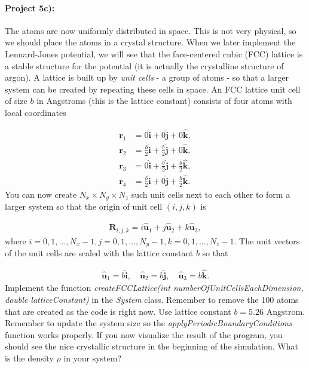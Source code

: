 \documentclass[%
oneside,                 %
final,                   %
10pt]{article}
\begin{document}
\paragraph{Project 5c):}
The atoms are now uniformly distributed in space. This is not very physical, so we should place the atoms in a crystal structure. When we later implement the Lennard-Jones potential, we will see that the face-centered cubic (FCC) lattice is a stable structure for the potential (it is actually the crystalline structure of argon). A lattice is built up by \emph{unit cells} - a group of atoms - so that a larger system can be created by repeating these cells in space. An FCC lattice unit cell of size $b$ in Angstroms (this is the lattice constant) consists of four atoms with local coordinates

\begin{align}
	\mathbf{r}_1 &= 0 \hat{\mathbf{i}} + 0 \hat{\mathbf{j}} + 0 \hat{\mathbf{k}},\\
	\mathbf{r}_2 &= \frac{b}{2} \hat{\mathbf{i}} + \frac{b}{2} \hat{\mathbf{j}} + 0 \hat{\mathbf{k}},\\
	\mathbf{r}_3 &= 0 \hat{\mathbf{i}} + \frac{b}{2} \hat{\mathbf{j}} + \frac{b}{2} \hat{\mathbf{k}},\\
	\mathbf{r}_4 &= \frac{b}{2} \hat{\mathbf{i}} + 0 \hat{\mathbf{j}} + \frac{b}{2} \hat{\mathbf{k}}.
\end{align}
You can now create $N_x \times N_y \times N_z$ such unit cells next to each other to form a larger system so that the origin of unit cell $(i,j,k)$ is

\begin{align}
	\mathbf{R}_{i,j,k} = i \hat{\mathbf{u}}_1 + j \hat{\mathbf{u}}_2 + k \hat{\mathbf{u}}_3,
\end{align}
where $i=0,1,..., N_x-1, j=0,1,..., N_y-1, k=0,1,..., N_z-1$. The unit vectors of the unit cells are scaled with the lattice constant $b$ so that

\begin{align}
	\hat{\mathbf{u}}_1 = b\hat{\mathbf{i}}, \quad \hat{\mathbf{u}}_2 = b\hat{\mathbf{j}}, \quad \hat{\mathbf{u}}_3 = b\hat{\mathbf{k}}.
\end{align}
Implement the function \emph{createFCCLattice(int numberOfUnitCellsEachDimension, double latticeConstant)} in the \emph{System} class. Remember to remove the 100 atoms that are created as the code is right now. Use lattice constant $b=5.26$ $\mathrm{Angstrom}$. Remember to update the system size so the \emph{applyPeriodicBoundaryConditions} function works properly. If you now visualize the result of the program, you should see the nice crystallic structure in the beginning of the simulation. What is the density $\rho$ in your system?
\end{document}
